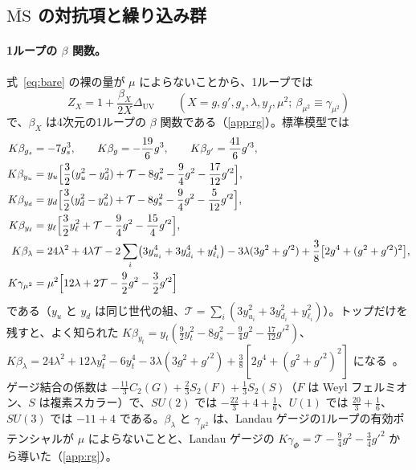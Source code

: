 \documentclass[a4paper,10pt]{ltjsarticle}
\newcommand{\MSbar}{\overline{\mathrm{MS}}}
\newcommand{\DUV}{\Delta_{\mathrm{UV}}}
\begin{document}
\subsection{$\MSbar$ の対抗項と繰り込み群}\label{sec:rg}

\paragraph{1ループの $\beta$ 関数。}式~\eqref{eq:bare} の裸の量が $\mu$ によらないことから、1ループでは
\begin{equation}
Z_X=1+\frac{\beta_X}{2X}\DUV\qquad(X=g,g',g_s,\lambda,y_f,\mu^2;\ \beta_{\mu^2}\equiv\gamma_{\mu^2})
\label{eq:zrule}
\end{equation}
で、$\beta_X$ は4次元の1ループの $\beta$ 関数である（\ref{app:rg}）。標準模型では
\begin{equation}
\begin{aligned}
K\beta_{g_s}&=-7g_s^3,\qquad K\beta_g=-\frac{19}6g^3,\qquad K\beta_{g'}=\frac{41}6g'^3,\\
K\beta_{y_u}&=y_u\Bigl[\frac32(y_u^2-y_d^2)+\mathcal T-8g_s^2-\frac94g^2-\frac{17}{12}g'^2\Bigr],\\
K\beta_{y_d}&=y_d\Bigl[\frac32(y_d^2-y_u^2)+\mathcal T-8g_s^2-\frac94g^2-\frac5{12}g'^2\Bigr],\\
K\beta_{y_\ell}&=y_\ell\Bigl[\frac32y_\ell^2+\mathcal T-\frac94g^2-\frac{15}4g'^2\Bigr],\\
K\beta_\lambda&=24\lambda^2+4\lambda\mathcal T-2\sum_i\bigl(3y_{u_i}^4+3y_{d_i}^4+y_{\ell_i}^4\bigr)-3\lambda(3g^2+g'^2)+\frac38\bigl[2g^4+(g^2+g'^2)^2\bigr],\\
K\gamma_{\mu^2}&=\mu^2\Bigl[12\lambda+2\mathcal T-\frac92g^2-\frac32g'^2\Bigr]
\end{aligned}
\label{eq:beta}
\end{equation}
である（$y_u$ と $y_d$ は同じ世代の組、$\mathcal T=\sum_i(3y_{u_i}^2+3y_{d_i}^2+y_{\ell_i}^2)$）。トップだけを残すと、よく知られた $K\beta_{y_t}=y_t(\frac92y_t^2-8g_s^2-\frac94g^2-\frac{17}{12}g'^2)$、$K\beta_\lambda=24\lambda^2+12\lambda y_t^2-6y_t^4-3\lambda(3g^2+g'^2)+\frac38[2g^4+(g^2+g'^2)^2]$ になる~\cite{mv1,mv2,mv3,arason92}。ゲージ結合の係数は $-\frac{11}3C_2(G)+\frac23S_2(F)+\frac13S_2(S)$（$F$ は Weyl フェルミオン、$S$ は複素スカラー）で、$SU(2)$ では $-\frac{22}3+4+\frac16$、$U(1)$ では $\frac{20}3+\frac16$、$SU(3)$ では $-11+4$ である。$\beta_\lambda$ と $\gamma_{\mu^2}$ は、Landau ゲージの1ループの有効ポテンシャルが $\mu$ によらないことと、Landau ゲージの $K\gamma_\Phi=\mathcal T-\frac94g^2-\frac34g'^2$ から導いた（\ref{app:rg}）。
\end{document}
